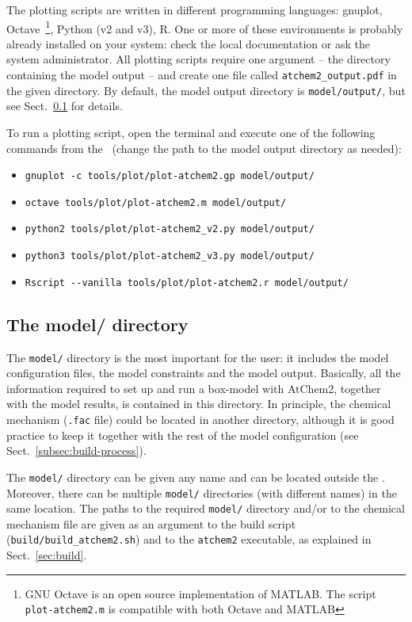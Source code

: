 The plotting scripts are written in different programming languages:
gnuplot, Octave~\footnote{GNU Octave is an open source implementation
  of MATLAB. The script \texttt{plot-atchem2.m} is compatible with
  both Octave and MATLAB}, Python (v2 and v3), R. One or more of these
environments is probably already installed on your system: check the
local documentation or ask the system administrator. All plotting
scripts require one argument -- the directory containing the model
output -- and create one file called \texttt{atchem2\_output.pdf} in
the given directory. By default, the model output directory is
\texttt{model/output/}, but see Sect.~\ref{subsec:model-directory} for
details.

To run a plotting script, open the terminal and execute one of the
following commands from the \maindir\ (change the path to the model
output directory as needed):

\begin{itemize}
\item \verb|gnuplot -c tools/plot/plot-atchem2.gp model/output/|
\item \verb|octave tools/plot/plot-atchem2.m model/output/|
\item \verb|python2 tools/plot/plot-atchem2_v2.py model/output/|
\item \verb|python3 tools/plot/plot-atchem2_v3.py model/output/|
\item \verb|Rscript --vanilla tools/plot/plot-atchem2.r model/output/|
\end{itemize}

\subsection{The model/ directory} \label{subsec:model-directory}

The \texttt{model/} directory is the most important for the user: it
includes the model configuration files, the model constraints and the
model output. Basically, all the information required to set up and
run a box-model with AtChem2, together with the model results, is
contained in this directory. In principle, the chemical mechanism
(\texttt{.fac} file) could be located in another directory, although
it is good practice to keep it together with the rest of the model
configuration (see Sect.~\ref{subsec:build-process}).

The \texttt{model/} directory can be given any name and can be located
outside the \maindir. Moreover, there can be multiple \texttt{model/}
directories (with different names) in the same location. The paths to
the required \texttt{model/} directory and/or to the chemical
mechanism file are given as an argument to the build script
(\texttt{build/build\_atchem2.sh}) and to the \texttt{atchem2}
executable, as explained in Sect.~\ref{sec:build}.

